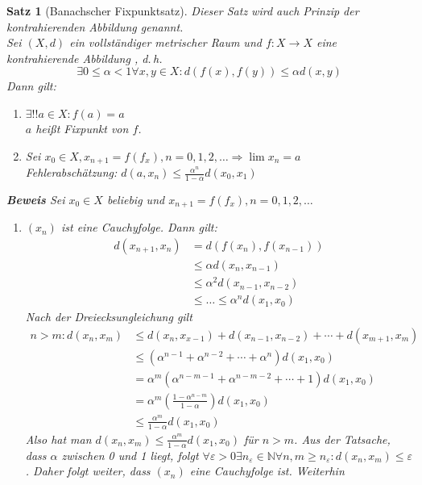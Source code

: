 \documentclass[ngerman,titlepage,twoside, parskip=half*]{scrreprt}
\newcommand*{\N}{\mathbb{N}}
\theoremstyle{plain}
\newtheorem{theorem}{Satz}[section]
\theoremstyle{definition}
\theoremstyle{remark}
\begin{document}
\begin{theorem}[Banachscher
  Fixpunktsatz]
  Dieser Satz wird auch \emph{Prinzip der kontrahierenden Abbildung} genannt.\\
Sei $(X,d)$ ein vollständiger metrischer Raum und $f\colon X\rightarrow X$ eine \emph{kontrahierende Abbildung
}, d.\,h.
\[\exists 0\leq\alpha <1 \forall x,y\in X\colon d(f(x),f(y))\leq \alpha d(x,y)\]
Dann gilt:
\begin{enumerate}[(1)]
  \item $\exists!! a\in X\colon f(a)=a$\\
    $a$ heißt \emph{Fixpunkt} von $f$.
  \item Sei $x_0\in X, x_{n+1}=f(f_x), n=0,1,2,\ldots \Rightarrow \lim x_n=a$\\
    Fehlerabschätzung: $d(a,x_n)\leq\frac{\alpha^n}{1-\alpha}d(x_0,x_1)$
\end{enumerate}
\textbf{Beweis} Sei $x_0\in X$ beliebig und $x_{n+1}=f(f_x), n=0,1,2,\ldots$
\begin{enumerate}[1. Schr{i}tt]
  \item $(x_n)$ ist eine Cauchyfolge. Dann gilt:
    \begin{align*}
      d(x_{n+1},x_n)&=d(f(x_n),f(x_{n-1}))\\
      & \leq \alpha d(x_n,x_{n-1})\\
      & \leq \alpha^2 d(x_{n-1},x_{n-2})\\
      & \leq \ldots \leq \alpha^n d(x_1,x_0)
    \end{align*}
    Nach der Dreiecksungleichung gilt 
    \begin{align*}
    n>m\colon d(x_n,x_m) & \leq d(x_n,x_{x-1})+d(x_{n-1},x_{n-2})+\cdots +d(x_{m+1},x_m)\\
    & \leq (\alpha^{n-1}+\alpha^{n-2}+\cdots +\alpha^n)d(x_1,x_0)\\
    & = \alpha^m(\alpha^{n-m-1}+\alpha^{n-m-2}+\cdots +1)d(x_1,x_0)\\
    & = \alpha^m\left(\frac{1-\alpha^{n-m}}{1-\alpha}\right)d(x_1,x_0)\\
    & \leq \frac{\alpha^m}{1-\alpha}d(x_1,x_0)
    \end{align*}
    Also hat man $d(x_n,x_m)\leq \frac{\alpha^m}{1-\alpha}d(x_1,x_0)$ für $n>m$. Aus der Tatsache, dass $\alpha$
    zwischen 0 und 1 liegt, folgt $\forall \varepsilon >0 \exists n_{\varepsilon}\in \N \forall n,m\geq
    n_{\varepsilon} \colon d(x_n,x_m)\leq \varepsilon$. Daher folgt weiter, dass $(x_n)$ eine Cauchyfolge ist. Weiterhin

\end{enumerate}
\end{theorem}
\end{document}
